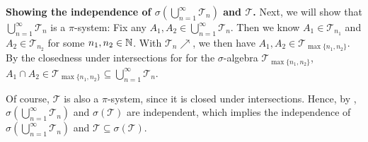 \begin{enumerate}
\begin{pf}
\textbf{Showing the independence of \(\sigma\left(\bigcup_{n=1}^{\infty}\mathcal{T}_n\right)\) and \(\mathcal{T}\).}
Next, we will show that \(\bigcup_{n=1}^{\infty}\mathcal{T}_n\) is a
\(\pi\)-system: Fix any \(A_1,A_2\in\bigcup_{n=1}^{\infty}\mathcal{T}_n\). Then
we know \(A_1\in\mathcal{T}_{n_1}\) and \(A_2\in\mathcal{T}_{n_2}\) for some \(n_1,n_2\in\mathbb{N}\).
With \(\mathcal{T}_n\nearrow\), we then have \(A_1,A_2\in\mathcal{T}_{\max\{n_1,n_2\}}\).
By the closedness under intersections for for the \(\sigma\)-algebra \(\mathcal{T}_{\max\{n_1,n_2\}}\),
\(A_1\cap A_2\in\mathcal{T}_{\max\{n_1,n_2\}}\subseteq \bigcup_{n=1}^{\infty}\mathcal{T}_n\).

Of course, \(\mathcal{T}\) is also a \(\pi\)-system, since it is closed under
intersections.  Hence, by ,
\(\sigma\left(\bigcup_{n=1}^{\infty}\mathcal{T}_n\right)\) and
\(\sigma(\mathcal{T})\) are independent, which implies the independence of
\(\sigma\left(\bigcup_{n=1}^{\infty}\mathcal{T}_n\right)\) and \(\mathcal{T}\subseteq \sigma(\mathcal{T})\).


\end{pf}
\end{enumerate}
